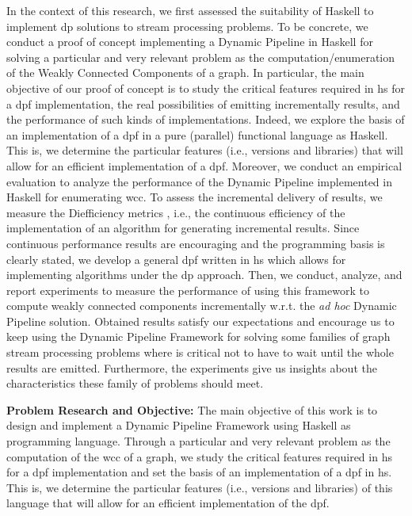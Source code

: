 In the context of this research, we first assessed the suitability of Haskell  to implement \acrshort{dp} solutions to stream processing problems.
To be concrete, we conduct a proof of concept implementing a Dynamic Pipeline in  Haskell for solving a particular and very relevant problem as the computation/e\-nu\-me\-ra\-tion of the Weakly Connected Components of a graph.
In particular, the main objective of our proof of concept is to study the critical features required in \acrshort{hs} for a \acrshort{dpf} implementation,  the real possibilities of emitting incrementally results, and the performance of such kinds of im\-ple\-men\-ta\-tions. 
Indeed, we explore the basis of an implementation of a \acrshort{dpf}  in a pure (parallel) functional language as Haskell. This is, we determine the particular features (i.e., versions and libraries) that will allow for an efficient implementation of a \acrshort{dpf}. Moreover, we conduct an empirical evaluation to analyze the performance of the Dynamic Pipeline implemented in Haskell for enumerating \acrshort{wcc}. To assess the incremental delivery of results, we measure the Diefficiency metrics \cite{diefpaper}, i.e., the continuous efficiency of the implementation of an algorithm for generating incremental results.
Since continuous performance results are encouraging and  the programming basis is clearly stated, we develop a general \acrlong{dpf} written in \acrlong{hs} which allows for implementing algorithms under the \acrlong{dp} approach. Then, we conduct, analyze, and report experiments to measure the performance of using this framework to compute weakly connected components incrementally w.r.t. the \textit{ad hoc}  Dynamic Pipeline solution.  
Obtained results satisfy our expectations and encourage us to keep using the Dynamic Pipeline Framework for solving some families of graph stream processing problems where is critical not to have to wait until the whole results are emitted. Furthermore, the experiments give us insights about the characteristics these family of problems should meet.

\textbf{Problem Research and Objective:}\label{research:obj} The main objective of this work is to design and implement a Dynamic Pipeline Framework using Haskell as programming language. Through a particular and very relevant problem as the computation of the \acrfull{wcc} of a graph, we study the critical features required in \acrshort{hs} for a \acrshort{dpf} implementation and set the basis of an implementation of a \acrshort{dpf}  in \acrshort{hs}. 
This is,  we determine the particular features (i.e., versions and libraries) of this language that will allow for an efficient implementation of the \acrshort{dpf}. 


